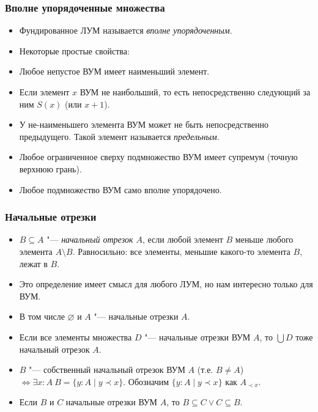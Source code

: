 \documentclass[10pt]{beamer}
\begin{document}
\begin{frame}
    \frametitle{Вполне упорядоченные множества}
    \begin{itemize}
        \item Фундированное ЛУМ называется \emph{вполне упорядоченным}.
        \item Некоторые простые свойства:
        \item Любое непустое ВУМ имеет наименьший элемент.
        \item Если элемент $x$ ВУМ не наибольший, то есть непосредственно следующий за ним $S(x)$ (или $x+1$).
        \item У не-наименьшего элемента ВУМ может не быть непосредственно предыдущего. Такой элемент называется \emph{предельным}.
        \item Любое ограниченное сверху подмножество ВУМ имеет супремум (точную верхнюю грань).
        \item Любое подмножество ВУМ само вполне упорядочено.
    \end{itemize}
\end{frame}

\begin{frame}
    \frametitle{Начальные отрезки}
    \begin{itemize}
        \item $B \subseteq A$ "--- \emph{начальный отрезок $A$}, если любой элемент $B$ меньше любого элемента $A \setminus B$. Равносильно: все элементы, меньшие какого-то элемента $B$, лежат в $B$.
        \item Это определение имеет смысл для любого ЛУМ, но нам интересно только для ВУМ.
        \item В том числе $\varnothing$ и $A$ "--- начальные отрезки $A$. 
        \item Если все элементы множества $D$ "--- начальные отрезки ВУМ $A$, то $\bigcup D$ тоже начальный отрезок $A$.
        \item $B$ "--- собственный начальный отрезок ВУМ $A$ (т.е. $B \neq A$) $\Leftrightarrow \exists x:A ~ B = \{y:A \mid y \prec x\}$. Обозначим $\{y:A \mid y \prec x\}$ как $A_{\prec x}$.
        \item Если $B$ и $C$ начальные отрезки ВУМ $A$, то $B \subseteq C \lor C \subseteq B$.
    \end{itemize}
\end{frame}
\end{document}
